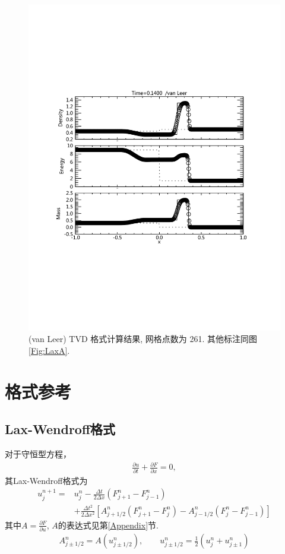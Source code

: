 \documentclass[10.5pt
]{article}
\begin{document}
\begin{figure}
\begin{center}
\includegraphics[width=.85\textwidth]{fig_tvd.pdf}
\caption{(van Leer) TVD 格式计算结果, 网格点数为 261. 其他标注同图\ref{Fig:LaxA}.}\label{Fig:vanLeerB}
\end{center}
\end{figure}

\section{格式参考}
\subsection{Lax-Wendroff格式}
对于守恒型方程，
\begin{align}
\frac{\partial u}{\partial t} + \frac{\partial F}{\partial x} = 0,
\end{align}
其Lax-Wendroff格式为
\begin{align}
u_j^{n+1} =& u_j^n - \frac{\Delta t}{2\Delta x} (F_{j+1}^n - F_{j-1}^n) \nonumber\\
& + \frac{\Delta t^2}{2\Delta x^2} \left[A_{j+1/2}^n (F_{j+1}^n-F_j^n) - A_{j-1/2}^n (F_j^n -
F_{j-1}^n)\right]
\end{align}
其中$A = \frac{\partial F}{\partial u}$, $A$的表达式见第\ref{Appendix}节.
\begin{align}
A_{j \pm 1/2}^n = A(u_{j \pm 1/2}^n), \qquad u_{j \pm 1/2}^n = \frac{1}{2} (u_j^n + u_{j \pm 1}^n)
\end{align}
\end{document}
